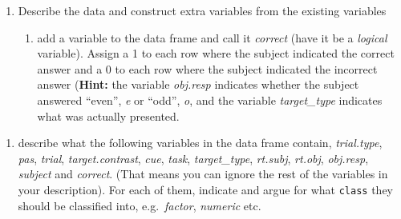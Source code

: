 \documentclass[
]{article}
\newenvironment{Shaded}{\begin{snugshade}}{\end{snugshade}}
\newcommand{\CommentTok}[1]{\textcolor[rgb]{0.56,0.35,0.01}{\textit{#1}}}
\newcommand{\DecValTok}[1]{\textcolor[rgb]{0.00,0.00,0.81}{#1}}
\newcommand{\FunctionTok}[1]{\textcolor[rgb]{0.00,0.00,0.00}{#1}}
\newcommand{\NormalTok}[1]{#1}
\newcommand{\OtherTok}[1]{\textcolor[rgb]{0.56,0.35,0.01}{#1}}
\newcommand{\SpecialCharTok}[1]{\textcolor[rgb]{0.00,0.00,0.00}{#1}}
\newcommand{\StringTok}[1]{\textcolor[rgb]{0.31,0.60,0.02}{#1}}
\providecommand{\tightlist}{%
  \setlength{\itemsep}{0pt}\setlength{\parskip}{0pt}}
\begin{document}
\begin{enumerate}
\def\labelenumi{\arabic{enumi})}
\setcounter{enumi}{1}
\tightlist
\item
  Describe the data and construct extra variables from the existing
  variables

  \begin{enumerate}
  \def\labelenumii{\roman{enumii}.}
  \tightlist
  \item
    add a variable to the data frame and call it \emph{correct} (have it
    be a \emph{logical} variable). Assign a 1 to each row where the
    subject indicated the correct answer and a 0 to each row where the
    subject indicated the incorrect answer (\textbf{Hint:} the variable
    \emph{obj.resp} indicates whether the subject answered ``even'',
    \emph{e} or ``odd'', \emph{o}, and the variable \emph{target\_type}
    indicates what was actually presented.
  \end{enumerate}
\end{enumerate}

\begin{Shaded}
\end{Shaded}

\begin{enumerate}
\def\labelenumi{\roman{enumi}.}
\setcounter{enumi}{1}
\tightlist
\item
  describe what the following variables in the data frame contain,
  \emph{trial.type}, \emph{pas}, \emph{trial}, \emph{target.contrast},
  \emph{cue}, \emph{task}, \emph{target\_type}, \emph{rt.subj},
  \emph{rt.obj}, \emph{obj.resp}, \emph{subject} and \emph{correct}.
  (That means you can ignore the rest of the variables in your
  description). For each of them, indicate and argue for what
  \texttt{class} they should be classified into, e.g.~\emph{factor},
  \emph{numeric} etc.
\end{enumerate}
\end{document}
